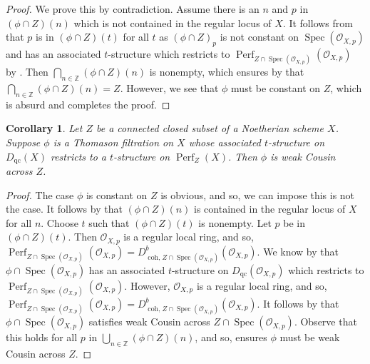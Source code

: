 \documentclass[11pt]{amsart}
\theoremstyle{plain}
\newtheorem{corollary}[theorem]{Corollary}
\theoremstyle{definition}
\numberwithin{equation}{section}
\numberwithin{theorem}{section}
\begin{document}
\begin{proof}
    We prove this by contradiction. Assume there is an $n$ and $p$ in $(\phi\cap Z)(n)$ which is not contained in the regular locus of $X$. It follows from  that $p$ is in $(\phi\cap Z)(t)$ for all $t$ as $(\phi \cap Z)_p$ is not constant on $\operatorname{Spec}(\mathcal{O}_{X,p})$ and has an associated $t$-structure which restricts to $\operatorname{Perf}_{Z\cap \operatorname{Spec}(\mathcal{O}_{X,p})} (\mathcal{O}_{X,p})$ by . Then $\bigcap_{n\in \mathbb{Z}} (\phi \cap Z)(n)$ is nonempty, which ensures by  that $\bigcap_{n\in \mathbb{Z}} (\phi \cap Z)(n) = Z$. However, we see that $\phi$ must be constant on $Z$, which is absurd and completes the proof.
\end{proof}

\begin{corollary}\label{cor:restrictability_implies_weak_cousin_across_and_contained_in_regular_locus}
    Let $Z$ be a connected closed subset of a Noetherian scheme $X$. Suppose $\phi$ is a Thomason filtration on $X$ whose associated $t$-structure on $D_{\operatorname{qc}}(X)$ restricts to a $t$-structure on $\operatorname{Perf}_Z(X)$. Then $\phi$ is weak Cousin across $Z$.
\end{corollary}

\begin{proof}
    The case $\phi$ is constant on $Z$ is obvious, and so, we can impose this is not the case.
    It follows by  that $(\phi\cap Z)(n)$ is contained in the regular locus of $X$ for all $n$. Choose $t$ such that $(\phi\cap Z)(t)$ is nonempty. Let $p$ be in $(\phi \cap  Z)(t)$. Then $\mathcal{O}_{X,p}$ is a regular local ring, and so, $\operatorname{Perf}_{Z\cap \operatorname{Spec}(\mathcal{O}_{X,p})}(\mathcal{O}_{X,p}) = D^b_{\operatorname{coh, }Z\cap \operatorname{Spec}(\mathcal{O}_{X,p})}(\mathcal{O}_{X,p})$. We know by  that $\phi \cap \operatorname{Spec}(\mathcal{O}_{X,p})$ has an associated $t$-structure on $D_{\operatorname{qc}}(\mathcal{O}_{X,p})$ which restricts to $\operatorname{Perf}_{Z\cap \operatorname{Spec}(\mathcal{O}_{X,p})}(\mathcal{O}_{X,p})$. However, $\mathcal{O}_{X,p}$ is a regular local ring, and so, $\operatorname{Perf}_{Z\cap \operatorname{Spec}(\mathcal{O}_{X,p})}(\mathcal{O}_{X,p}) = D^b_{\operatorname{coh, }Z\cap \operatorname{Spec}(\mathcal{O}_{X,p})}(\mathcal{O}_{X,p})$. It follows by  that $\phi\cap \operatorname{Spec}(\mathcal{O}_{X,p})$ satisfies weak Cousin across $Z\cap \operatorname{Spec}(\mathcal{O}_{X,p})$. Observe that this holds for all $p$ in $\bigcup_{n\in \mathbb{Z}} (\phi\cap Z)(n)$, and so,  ensures $\phi$ must be weak Cousin across $Z$.
\end{proof}
\end{document}
